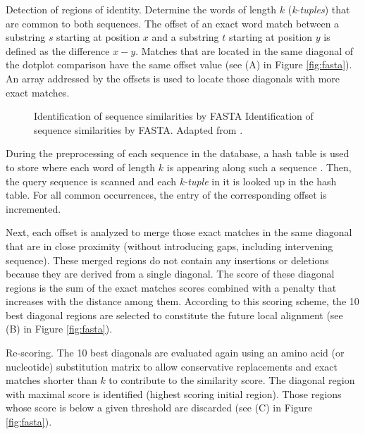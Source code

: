 \begin{menumerate}
\item
Detection of regions of identity. Determine the words of length $k$ (\emph{k-tuples}) that are common 
to both sequences. The offset of an exact word match between a substring $s$ starting at position $x$ and a
substring $t$ starting at position $y$ is defined as the difference $x - y$. Matches that are located in 
the same diagonal of the dotplot comparison have the same offset value (see (A) in Figure \ref{fig:fasta}).
An array addressed by the offsets is used to locate those diagonals with more exact matches.

\begin{figure}[t!]
\begin{center}
\setlength{\fboxsep}{0pt}
          {Identification of sequence similarities by FASTA}%
          {Identification of sequence similarities by FASTA.}%
          {Adapted from \citet{pearson:1988a}.}
\end{center}
\end{figure}

During the preprocessing of each sequence in the database, a hash table is used to store where each word 
of length $k$ is appearing along such a sequence \citep{dumas:1982a}. Then, the query sequence is scanned 
and each \emph{k-tuple} in it is looked up in the hash table. For all common occurrences, the entry 
of the corresponding offset is incremented. 

Next, each offset is analyzed to merge those exact matches in the same diagonal that are in close 
proximity (without introducing gaps, including intervening sequence). These merged regions do not 
contain any insertions or deletions because they are derived from a single diagonal. The score of these 
diagonal regions is the sum of the exact matches scores combined with a penalty that increases with the 
distance among them. According to this scoring scheme, the 10 best diagonal regions are selected to constitute 
the future local alignment (see (B) in Figure \ref{fig:fasta}). 

\item
Re-scoring. The 10 best diagonals are evaluated again using an amino acid (or nucleotide) substitution 
matrix to allow conservative replacements and exact matches shorter than $k$ to contribute to the 
similarity score. The diagonal region with maximal score is identified (highest scoring initial region). 
Those regions whose score is below a given threshold are discarded (see (C) in Figure \ref{fig:fasta}).


\end{menumerate}
